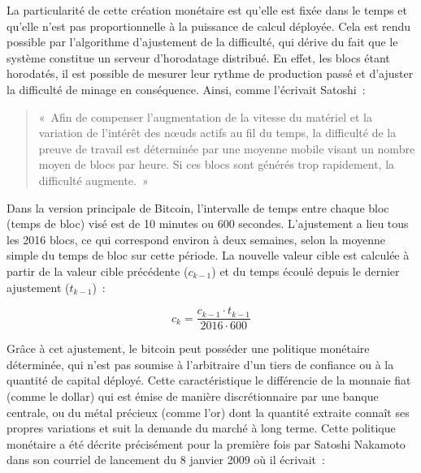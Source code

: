 La particularité de cette création monétaire est qu'elle est fixée dans le temps et qu'elle n'est pas proportionnelle à la puissance de calcul déployée. Cela est rendu possible par l'algorithme d'ajustement de la difficulté, qui dérive du fait que le système constitue un serveur d'horodatage distribué. En effet, les blocs étant horodatés, il est possible de mesurer leur rythme de production passé et d'ajuster la difficulté de minage en conséquence. Ainsi, comme l'écrivait Satoshi~:

\begin{quote}
«~Afin de compenser l'augmentation de la vitesse du matériel et la variation de l'intérêt des nœuds actifs au fil du temps, la difficulté de la preuve de travail est déterminée par une moyenne mobile visant un nombre moyen de blocs par heure. Si ces blocs sont générés trop rapidement, la difficulté augmente.~»
\end{quote}

Dans la version principale de Bitcoin, l'intervalle de temps entre chaque bloc (temps de bloc) visé est de 10 minutes ou 600 secondes. L'ajustement a lieu tous les 2016 blocs, ce qui correspond environ à deux semaines, selon la moyenne simple du temps de bloc sur cette période. La nouvelle valeur cible est calculée à partir de la valeur cible précédente ($c_{k-1}$) et du temps écoulé depuis le dernier ajustement ($t_{k-1}$)~:

{ \small
\[
c_{k} = \frac{c_{k-1} \cdot t_{k-1}}{2016 \cdot 600}
\]
}

Grâce à cet ajustement, le bitcoin peut posséder une politique monétaire déterminée, qui n'est pas soumise à l'arbitraire d'un tiers de confiance ou à la quantité de capital déployé. Cette caractéristique le différencie de la monnaie fiat (comme le dollar) qui est émise de manière discrétionnaire par une banque centrale, ou du métal précieux (comme l'or) dont la quantité extraite connaît ses propres variations et suit la demande du marché à long terme. Cette politique monétaire a été décrite précisément pour la première fois par Satoshi Nakamoto dans son courriel de lancement du 8 janvier 2009 où il écrivait~:

